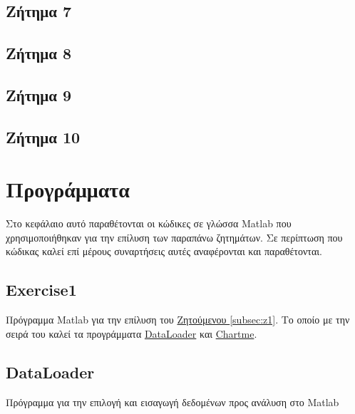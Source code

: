 \documentclass[11pt]{scrartcl} %
\begin{document}
\subsection{Ζήτημα 7}
\label{subsec:z7}

\subsection{Ζήτημα 8}
\label{subsec:z8}

\subsection{Ζήτημα 9}
\label{subsec:z9}

\subsection{Ζήτημα 10}
\label{subsec:z10}



\section{Προγράμματα}
\label{sec:Prog}
Στο κεφάλαιο αυτό παραθέτονται οι κώδικες σε γλώσσα Matlab που χρησιμοποιήθηκαν για την επίλυση των παραπάνω ζητημάτων. Σε περίπτωση που  κώδικας καλεί επί μέρους συναρτήσεις αυτές αναφέρονται και παραθέτονται. 

\subsection{Exercise1}
\label{prog:1}
Πρόγραμμα Matlab για την επίλυση του \hyperref[subsection:z1]{Ζητούμενου \ref*{subsec:z1}}. Το οποίο με την σειρά του καλεί τα προγράμματα \hyperref[prog:DataLoader]{DataLoader} και \hyperref[prog:Chartme]{Chartme}.




\subsection{DataLoader}
\label{prog:DataLoader}
Πρόγραμμα για την επιλογή και εισαγωγή δεδομένων προς ανάλυση στο Matlab

\end{document}
